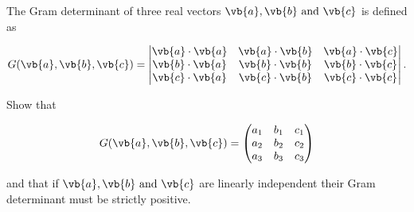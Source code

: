 \documentclass[a4paper,12pt]{report}
\begin{document}
{The Gram determinant of three real vectors \(\vb{a} ,\vb{b} \text { and } \vb{c} \) is defined as 

\begin{equation}
    G(\vb{a} ,\vb{b} ,\vb{c} ) = \begin{vmatrix}
        \vb{a} \cdot \vb{a}  & \vb{a} \cdot \vb{b}  & \vb{a} \cdot \vb{c}   \\
        \vb{b} \cdot \vb{a}  & \vb{b} \cdot \vb{b}  & \vb{b} \cdot \vb{c}   \\
        \vb{c} \cdot \vb{a}  & \vb{c} \cdot \vb{b}  & \vb{c} \cdot \vb{c}   \\
    \end{vmatrix}.
\end{equation}

Show that 

\begin{equation}
    G(\vb{a} ,\vb{b} ,\vb{c} ) = \begin{pmatrix}
        a_1  & b_1  & c_1   \\
        a_2  & b_2  & c_2   \\
        a_3  & b_3  & c_3   \\
    \end{pmatrix}
\end{equation}

and that if \(\vb{a} ,\vb{b} \text { and } \vb{c} \) are linearly independent their Gram determinant must be strictly positive. 
}
\end{document}
